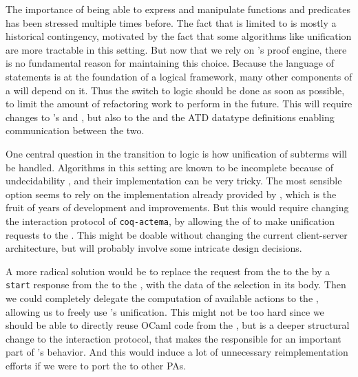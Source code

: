 The importance of being able to express and manipulate  functions
and predicates has been stressed multiple times before. The fact that  is
limited to  is mostly a historical contingency, motivated by
the fact that some algorithms like unification are more tractable in this
setting. But now that we rely on 's proof engine, there is no fundamental
reason for maintaining this choice. Because the language of statements is at the
foundation of a logical framework, many other components of a 
will depend on it. Thus the switch to  logic should be done as soon
as possible, to limit the amount of refactoring work to perform in the future.
This will require changes to 's  and ,
but also to the   and the ATD datatype definitions enabling
communication between the two.

One central question in the transition to  logic is how unification
of subterms will be handled. Algorithms in this setting are known to be
incomplete because of undecidability , and
their implementation can be very tricky. The most sensible option seems to rely
on the implementation already provided by , which is the fruit of years of
development and improvements. But this would require changing the interaction
protocol of \texttt{coq-actema}, by allowing the  of  to
make unification requests to the . This might be doable without
changing the current client-server architecture, but will probably involve some
intricate design decisions.

A more radical solution would be to replace the  request from
the  to the  by a \texttt{start} response
from the  to the , with the data of the
selection in its body. Then we could completely delegate the computation of
available actions to the , allowing us to freely use 's
unification. This might not be too hard since we should be able to directly
reuse OCaml code from the , but is a deeper structural change
to the interaction protocol, that makes the  responsible for an
important part of 's behavior. And this would induce a lot of unnecessary
reimplementation efforts if we were to port the  to other PAs.

